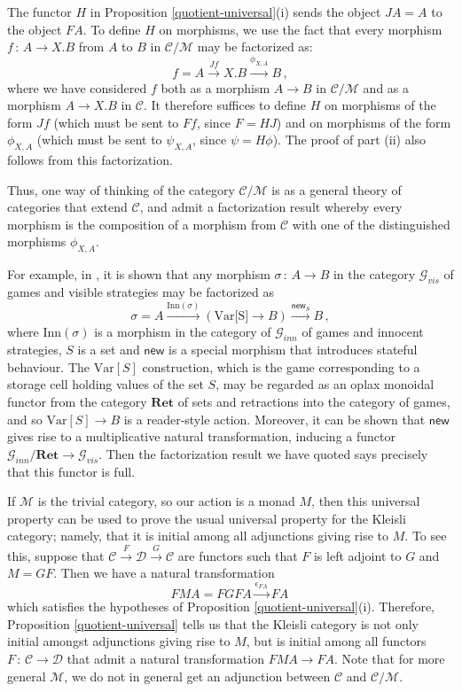 \documentclass{svproc}
\newcommand\C{\mathcal{C}}
\newcommand\D{\mathcal{D}}
\newcommand\G{\mathcal{G}}
\newcommand\M{\mathcal{M}}
\newcommand\from{\,\colon\,}
\newcommand{\catname}[1]{\mathbf{#1}}
\newcommand{\Ret}{\catname{Ret}}
\begin{document}
\begin{remark}
  The functor $H$ in Proposition \ref{quotient-universal}(i) sends the object $JA=A$ to the object $FA$.  
  To define $H$ on morphisms, we use the fact that every morphism $f\from A \to X.B$ from $A$ to $B$ in $\C/\M$ may be factorized as:
  \[
    f = A \xrightarrow{Jf}
    X.B \xrightarrow{\phi_{X,A}}
    B\,,
    \]
  where we have considered $f$ both as a morphism $A\to B$ in $\C/\M$ and as a morphism $A \to X.B$ in $\C$.  
  It therefore suffices to define $H$ on morphisms of the form $Jf$ (which must be sent to $Ff$, since $F=HJ$) and on morphisms of the form $\phi_{X,A}$ (which must be sent to $\psi_{X,A}$, since $\psi=H\phi$).  
  The proof of part (ii) also follows from this factorization.

  Thus, one way of thinking of the category $\C/\M$ is as a general theory of categories that extend $\C$, and admit a factorization result whereby every morphism is the composition of a morphism from $\C$ with one of the distinguished morphisms $\phi_{X,A}$.

  For example, in \cite{SamsonGuyIAPassive}, it is shown that any morphism $\sigma \from A\to B$ in the category $\G_{vis}$ of games and visible strategies may be factorized as
  \[
    \sigma = A \xrightarrow{\text{Inn}(\sigma)}
    (\text{Var[S]} \to B) \xrightarrow{\textsf{new}_S}
    B\,,
    \]
  where $\text{Inn}(\sigma)$ is a morphism in the category of $\G_{inn}$ of games and innocent strategies, $S$ is a set and $\textsf{new}$ is a special morphism that introduces stateful behaviour.  
  The $\text{Var}[S]$ construction, which is the game corresponding to a storage cell holding values of the set $S$, may be regarded as an oplax monoidal functor from the category $\Ret$ of sets and retractions into the category of games, and so $\text{Var}[S]\to B$ is a reader-style action.  
  Moreover, it can be shown that $\textsf{new}$ gives rise to a multiplicative natural transformation, inducing a functor $\G_{inn}/\Ret\to \G_{vis}$.  
  Then the factorization result we have quoted says precisely that this functor is full.
\end{remark}
\begin{remark}
  If $\M$ is the trivial category, so our action is a monad $M$, then this universal property can be used to prove the usual universal property for the Kleisli category; namely, that it is initial among all adjunctions giving rise to $M$.  
  To see this, suppose that $\C \xrightarrow{F} \D \xrightarrow{G} \C$ are functors such that $F$ is left adjoint to $G$ and $M=GF$.  
  Then we have a natural transformation
  \[
    FMA = FGF A \xrightarrow{\epsilon_{F A}} F A\,
    \]
  which satisfies the hypotheses of Proposition \ref{quotient-universal}(i).  
  Therefore, Proposition \ref{quotient-universal} tells us that the Kleisli category is not only initial amongst adjunctions giving rise to $M$, but is initial among all functors $F\from \C \to \D$ that admit a natural transformation $FMA \to FA$.
  Note that for more general $\M$, we do not in general get an adjunction between $\C$ and $\C/\M$.
\end{remark}
\end{document}
